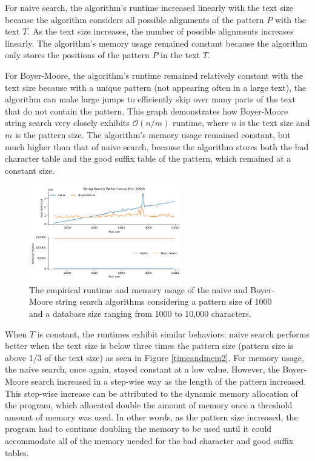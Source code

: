 \documentclass[11pt, letterpaper]{article}
\begin{document}
For naive search, the algorithm's runtime increased linearly with
the text size because the algorithm considers all possible alignments of the
pattern $P$ with the text $T$. As the text size increases, the number of
possible alignments increases linearly. The algorithm's memory usage remained
constant because the algorithm only stores the positions of the pattern $P$ in
the text $T$. 

For Boyer-Moore, the algorithm's runtime remained relatively constant with the text size because with a unique pattern (not appearing often in a large text), the algorithm can make large jumps to efficiently skip over many parts of the text that do not contain the pattern. This graph demonstrates how Boyer-Moore string search very closely exhibits $\mathcal{O}(n/m)$ runtime, where $n$ is the text size and $m$ is the pattern size. The algorithm's memory usage remained constant, but much higher than that of naive search, because the algorithm stores both the bad character table and the good suffix table of the pattern, which remained at a constant size.

\begin{figure}[ht] \centering
    \includegraphics[width=0.6\textwidth]{t-range_p-1000.png}
    \caption{The empirical runtime and memory usage of the naive and Boyer-Moore string search
    algorithms considering a pattern size of 1000 and a database size ranging
    from 1000 to 10,000 characters.}
    \label{timeandmem}
\end{figure}

\newpage

When $T$ is constant, the runtimes exhibit similar behaviors: naive search performs better when the text size is below three times the pattern size (pattern size is above 1/3 of the text size) as seen in Figure \ref{timeandmem2}. For memory usage, the naive search, once again, stayed constant at a low value. However, the Boyer-Moore search increased in a step-wise way as the length of the pattern increased. This step-wise increase can be attributed to the dynamic memory allocation of the program, which allocated double the amount of memory once a threshold amount of memory was used. In other words, as the pattern size increased, the program had to continue doubling the memory to be used until it could accommodate all of the memory needed for the bad character and good suffix tables.\\\\
\end{document}
